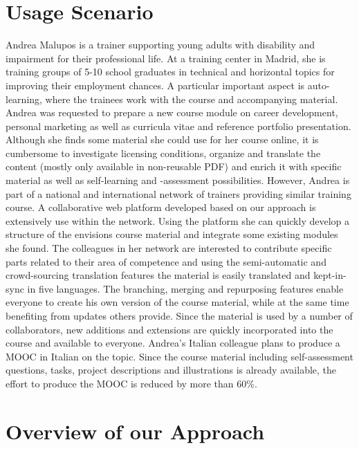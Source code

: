 \documentclass[ngerman,UKenglish,table]{scrbook}
\begin{document}
\section{Usage Scenario}  
Andrea Malupos is a trainer supporting young adults with disability and impairment for their professional life.
At a training center in Madrid, she is training groups of 5-10 school graduates in technical and horizontal topics for improving their employment chances.
A particular important aspect is auto-learning, where the trainees work with the course and accompanying material.
Andrea was requested to prepare a new course module on career development, personal marketing as well as curricula vitae and reference portfolio presentation.
Although she finds some material she could use for her course online, it is cumbersome to investigate licensing conditions, organize and translate the content (mostly only available in non-reusable PDF) and enrich it with specific material as well as self-learning and -assessment possibilities.
However, Andrea is part of a national and international network of trainers providing similar training course.
A collaborative web platform developed based on our approach is extensively use within the network.
Using the platform she can quickly develop a structure of the envisions course material and integrate some existing modules she found.
The colleagues in her network are interested to contribute specific parts related to their area of competence and using the semi-automatic and crowd-sourcing translation features the material is easily translated and kept-in-sync in five languages.
The branching, merging and repurposing features enable everyone to create his own version of the course material, while at the same time benefiting from updates others provide.
Since the material is used by a number of collaborators, new additions and extensions are quickly incorporated into the course and available to everyone.
Andrea's Italian colleague plans to produce a MOOC in Italian on the topic.
Since the course material including self-assessment questions, tasks, project descriptions and illustrations is already available, the effort to produce the MOOC is reduced by more than 60\%.

\section{Overview of our Approach}
\label{section:approach_overview}
\end{document}
